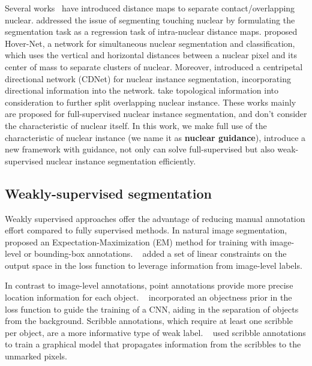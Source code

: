 Several works~\citep{chen2023cpp, graham2019hover, liu2021mdc, naylor2018segmentation} have introduced distance maps to separate contact/overlapping nuclear. 
\citet{naylor2018segmentation} addressed the issue of segmenting touching nuclear by formulating the segmentation task as a regression task of intra-nuclear distance maps.
\citet{graham2019hover} proposed Hover-Net, a network for simultaneous nuclear segmentation and classification, which uses the vertical and horizontal distances between a nuclear pixel and its center of mass to separate clusters of nuclear. 
Moreover, \citet{he2021cdnet} introduced a centripetal directional network (CDNet) for nuclear instance segmentation, incorporating directional information into the network. \citet{he2023toposeg} take topological information into consideration to further split overlapping nuclear instance.
These works mainly are proposed for full-supervised nuclear instance segmentation, and don't consider the characteristic of nuclear itself.
In this work, we make full use of the characteristic of nuclear instance (we name it as \textbf{nuclear guidance}), introduce a new framework with guidance, not only can solve full-supervised but also weak-supervised nuclear instance segmentation efficiently.

\subsection{Weakly-supervised segmentation}
Weakly supervised approaches offer the advantage of reducing manual annotation effort compared to fully supervised methods. 
In natural image segmentation, ~\citet{papandreou2015weakly} proposed an Expectation-Maximization (EM) method for training with image-level or bounding-box annotations. ~\citet{pathak2015constrained} added a set of linear constraints on the output space in the loss function to leverage information from image-level labels.

In contrast to image-level annotations, point annotations provide more precise location information for each object. ~\citet{bearman2016s} incorporated an objectness prior in the loss function to guide the training of a CNN, aiding in the separation of objects from the background. Scribble annotations, which require at least one scribble per object, are a more informative type of weak label. ~\citet{lin2016scribblesup} used scribble annotations to train a graphical model that propagates information from the scribbles to the unmarked pixels.

